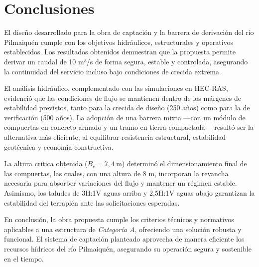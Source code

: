 \documentclass{article} %
\begin{document}
\newpage
\section{Conclusiones}

El diseño desarrollado para la obra de captación y la barrera de derivación del río Pilmaiquén cumple con los objetivos hidráulicos, estructurales y operativos establecidos. Los resultados obtenidos demuestran que la propuesta permite derivar un caudal de 10 m³/s de forma segura, estable y controlada, asegurando la continuidad del servicio incluso bajo condiciones de crecida extrema.

El análisis hidráulico, complementado con las simulaciones en HEC-RAS, evidenció que las condiciones de flujo se mantienen dentro de los márgenes de estabilidad previstos, tanto para la crecida de diseño (250 años) como para la de verificación (500 años). La adopción de una barrera mixta —con un módulo de compuertas en concreto armado y un tramo en tierra compactada— resultó ser la alternativa más eficiente, al equilibrar resistencia estructural, estabilidad geotécnica y economía constructiva.

La altura crítica obtenida (\(B_c = 7{,}4\ \text{m}\)) determinó el dimensionamiento final de las compuertas, las cuales, con una altura de 8 m, incorporan la revancha necesaria para absorber variaciones del flujo y mantener un régimen estable. Asimismo, los taludes de 3H:1V aguas arriba y 2,5H:1V aguas abajo garantizan la estabilidad del terraplén ante las solicitaciones esperadas.

En conclusión, la obra propuesta cumple los criterios técnicos y normativos aplicables a una estructura de \textit{Categoría A}, ofreciendo una solución robusta y funcional. El sistema de captación planteado aprovecha de manera eficiente los recursos hídricos del río Pilmaiquén, asegurando su operación segura y sostenible en el tiempo.
\end{document}
